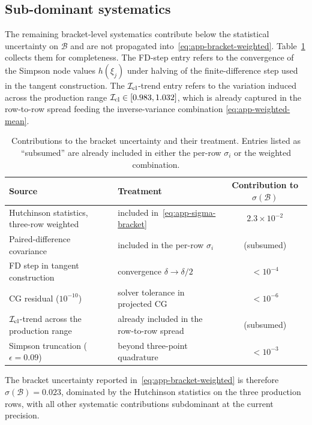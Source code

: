 \documentclass[a4paper,11pt]{article}
\theoremstyle{definition}
\newcommand{\Icl}{\mathcal{I}_{\rm cl}}
\newcommand{\Bobs}{\mathcal{B}}
\begin{document}
\subsection{Sub-dominant systematics}
\label{app:err-sub-dominant}

The remaining bracket-level systematics contribute below the
statistical uncertainty on $\Bobs$ and are not propagated
into~\eqref{eq:app-bracket-weighted}.
Table~\ref{tab:app-error-budget} collects them for completeness. The
FD-step entry refers to the convergence of the Simpson node values
$h(\xi_j)$ under halving of the finite-difference step used in the
tangent construction. The $\Icl$-trend entry refers to the variation
induced across the production range $\Icl \in [0.983, 1.032]$, which is
already captured in the row-to-row spread feeding the inverse-variance
combination \eqref{eq:app-weighted-mean}.

\begin{table}[h]
\centering
\begin{tabular}{llc}
\toprule
Source & Treatment & Contribution to $\sigma(\Bobs)$ \\
\midrule
Hutchinson statistics, three-row weighted
  & included in~\eqref{eq:app-sigma-bracket}
  & $2.3 \times 10^{-2}$ \\
Paired-difference covariance
  & included in the per-row $\sigma_i$
  & (subsumed) \\
FD step in tangent construction
  & convergence $\delta \to \delta/2$
  & $< 10^{-4}$ \\
CG residual ($10^{-10}$)
  & solver tolerance in projected CG
  & $< 10^{-6}$ \\
$\Icl$-trend across the production range
  & already included in the row-to-row spread
  & (subsumed) \\
Simpson truncation ($\epsilon = 0.09$)
  & beyond three-point quadrature
  & $< 10^{-3}$ \\
\bottomrule
\end{tabular}
\caption{Contributions to the bracket uncertainty and their treatment.
Entries listed as ``subsumed'' are already included in either the
per-row $\sigma_i$ or the weighted combination.}
\label{tab:app-error-budget}
\end{table}

The bracket uncertainty reported in~\eqref{eq:app-bracket-weighted} is
therefore $\sigma(\Bobs) = 0.023$, dominated by the Hutchinson
statistics on the three production rows, with all other systematic
contributions subdominant at the current precision.
\end{document}
